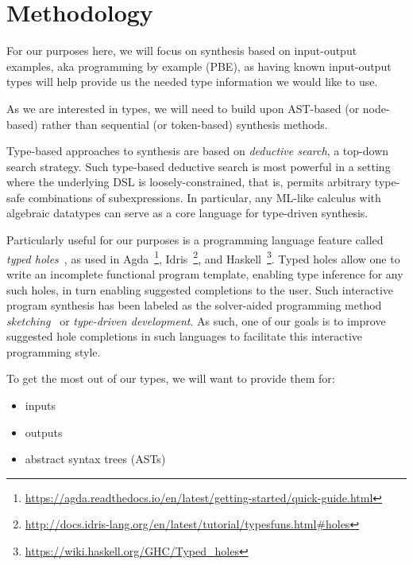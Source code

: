 \documentclass{article}
\begin{document}
\section{Methodology} %

For our purposes here, we will focus on synthesis based on input-output examples, aka programming by example (PBE),
as having known input-output types will help provide us the needed type information we would like to use.

As we are interested in types, we will need to build upon AST-based (or node-based) rather than sequential (or token-based) synthesis methods.

Type-based approaches to synthesis are based on \emph{deductive search}, a top-down search strategy.
Such type-based deductive search is most powerful in a setting where the underlying DSL is loosely-constrained,
that is, permits arbitrary type-safe combinations of subexpressions.
In particular, any ML-like calculus with algebraic datatypes can serve as a core language for type-driven synthesis.~\citep{gulwani2017program}

Particularly useful for our purposes is a programming language feature called \emph{typed holes}~\citep{hashimoto1997typed},
as used in Agda~\footnote{\url{https://agda.readthedocs.io/en/latest/getting-started/quick-guide.html}},
Idris~\footnote{\url{http://docs.idris-lang.org/en/latest/tutorial/typesfuns.html\#holes}},
and Haskell~\footnote{\url{https://wiki.haskell.org/GHC/Typed_holes}}.
Typed holes allow one to write an incomplete functional program template,
enabling type inference for any such holes, in turn enabling suggested completions to the user.
Such interactive program synthesis has been labeled as the solver-aided
programming method \emph{sketching}~\citep{gulwani2017program} or
\emph{type-driven development}.
As such, one of our goals is to improve suggested hole completions in such languages to facilitate this interactive programming style.

To get the most out of our types, we will want to provide them for:
\begin{itemize}
    \item inputs
    \item outputs
    \item abstract syntax trees (ASTs)
\end{itemize}
\end{document}
